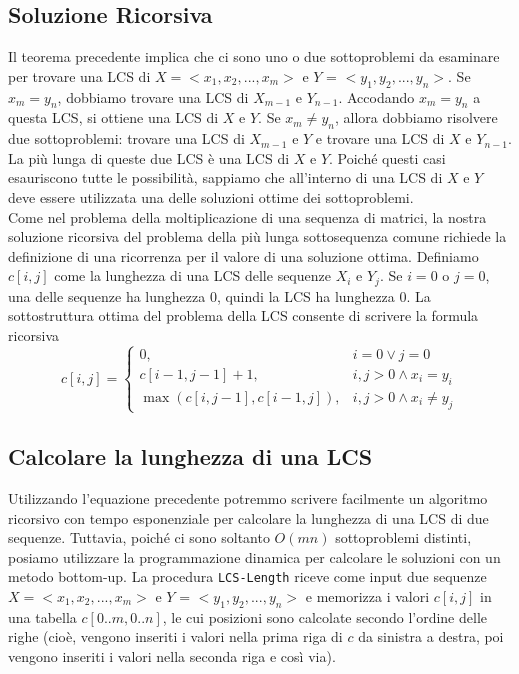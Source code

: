 \subsection{Soluzione Ricorsiva}

Il teorema precedente implica che ci sono uno o due sottoproblemi da
esaminare per trovare una LCS di $X = <x_1, x_2, ..., x_m>$ e $Y$ =
$<y_1, y_2, ..., y_n>$. Se $x_m = y_n$, dobbiamo trovare una LCS di
$X_{m-1}$ e $Y_{n-1}$. Accodando $x_m = y_n$ a questa LCS, si
ottiene una LCS di $X$ e $Y$. Se $x_m \neq y_n$, allora dobbiamo
risolvere due sottoproblemi: trovare una LCS di $X_{m-1}$ e $Y$ e
trovare una LCS di $X$ e $Y_{n-1}$. La più lunga di queste due LCS è
una LCS di $X$ e $Y$. Poiché questi casi esauriscono tutte le
possibilità, sappiamo che all'interno di una LCS di $X$ e $Y$ deve
essere utilizzata una delle soluzioni ottime dei sottoproblemi.\\

Come nel problema della moltiplicazione di una sequenza di matrici, la
nostra soluzione ricorsiva del problema della più lunga sottosequenza
comune richiede la definizione di una ricorrenza per il valore di una
soluzione ottima. Definiamo $c[i,j]$ come la lunghezza di una LCS
delle sequenze $X_i$ e $Y_j$. Se $i = 0$ o $j = 0$, una delle
sequenze ha lunghezza 0, quindi la LCS ha lunghezza 0. La sottostruttura
ottima del problema della LCS consente di scrivere la formula ricorsiva\\

$$
  c[i,j]= \begin{cases}
    0,                          & i = 0 \vee j = 0            \\
    c[i-1, j-1] + 1,            & i, j > 0 \wedge x_i = y_i   \\
    \max(c[i, j-1], c[i-1, j]), & i,j > 0 \wedge x_i \neq y_j
  \end{cases}
$$

\subsection{Calcolare la lunghezza di una LCS}

Utilizzando l'equazione precedente potremmo scrivere facilmente un
algoritmo ricorsivo con tempo esponenziale per calcolare la lunghezza di
una LCS di due sequenze. Tuttavia, poiché ci sono soltanto $O(mn)$
sottoproblemi distinti, posiamo utilizzare la programmazione dinamica
per calcolare le soluzioni con un metodo bottom-up. La procedura
\texttt{LCS-Length} riceve come input due sequenze
$X = <x_1, x_2, ..., x_m>$ e $Y$ = $<y_1, y_2, ..., y_n>$ e
memorizza i valori $c[i,j]$ in una tabella $c[0..m, 0..n]$, le cui
posizioni sono calcolate secondo l'ordine delle righe (cioè, vengono
inseriti i valori nella prima riga di $c$ da sinistra a destra, poi
vengono inseriti i valori nella seconda riga e così via).\\

